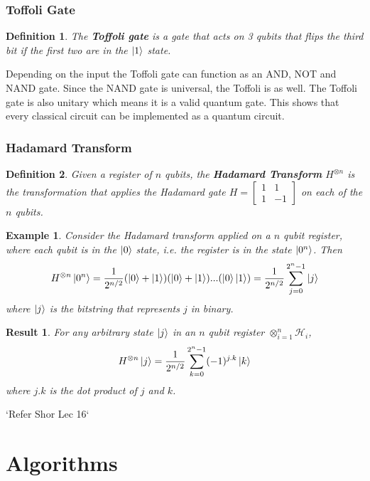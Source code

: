 \documentclass[12pt,twoside,fleqn]{report}
\theoremstyle{thmstyle}
\newtheorem{defn}{Definition}[chapter]
\newtheorem{eg}{Example}[chapter]
\newtheorem{result}{Result}[chapter]
\begin{document}
\subsection{Toffoli Gate}
\begin{defn}
    The \textbf{Toffoli gate} is a gate that acts on 3 qubits that flips the third bit if the first two are in the $\ket{1}$ state.\\
\end{defn}

Depending on the input the Toffoli gate can function as an AND, NOT and NAND gate. Since the NAND gate is universal, the Toffoli is as well. The Toffoli gate is also unitary which means it is a valid quantum gate. This shows that every classical circuit can be implemented as a quantum circuit.

\subsection{Hadamard Transform}
\begin{defn}
    Given a register of $n$ qubits, the \textbf{Hadamard Transform} $H^{\otimes n}$ is the transformation that applies the Hadamard gate $H = \begin{bmatrix} 1 & 1 \\ 1 & -1 \end{bmatrix}$ on each of the $n$ qubits.
\end{defn}
\begin{eg}
    Consider the Hadamard transform applied on a $n$ qubit register, where each qubit is in the $\ket{0}$ state, i.e. the register is in the state $\ket{0^n}$.
    Then \[ H^{\otimes n} \ket{0^n} = \frac{1}{2^{n/2}} (\ket{0} + \ket{1})(\ket{0} + \ket{1})...(\ket{0} \ket{1}) = \frac{1}{2^{n/2}} \sum_{j=0}^{2^n-1} \ket{j} \] where $\ket{j}$ is the bitstring that represents $j$ in binary.
\end{eg}

\begin{result}
    For any arbitrary state $\ket{j}$ in an $n$ qubit register $\otimes_{i=1}^n \mathcal{H}_i$, \[ H^{\otimes n} \ket{j} = \frac{1}{2^{n/2}} \sum_{k=0}^{2^n-1} (-1)^{j.k} \ket{k}\] where $j.k$ is the dot product of $j$ and $k$.
\end{result}
`Refer Shor Lec 16`

\chapter{Algorithms}
\end{document}
